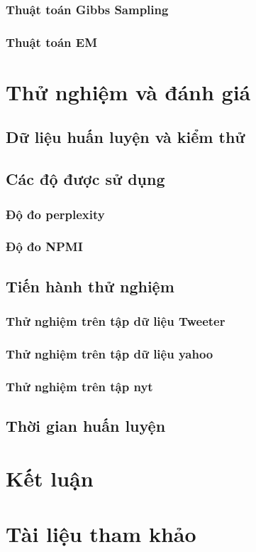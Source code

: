 \documentclass[fontsize=13pt]{scrartcl}
\begin{document}
\subsubsection{Thuật toán Gibbs Sampling}
\subsubsection{Thuật toán EM}
\section{Thử nghiệm và đánh giá}
\subsection{Dữ liệu huấn luyện và kiểm thử}
\subsection{Các độ được sử dụng}
\subsubsection{Độ đo perplexity}
\subsubsection{Độ đo NPMI}
\subsection{Tiến hành thử nghiệm}
\subsubsection{Thử nghiệm trên tập dữ liệu Tweeter}
\subsubsection{Thử nghiệm trên tập dữ liệu yahoo}
\subsubsection{Thử nghiệm trên tập nyt}
\subsection{Thời gian huấn luyện}
\section{Kết luận}
\section{Tài liệu tham khảo}
\newpage


\end{document}
